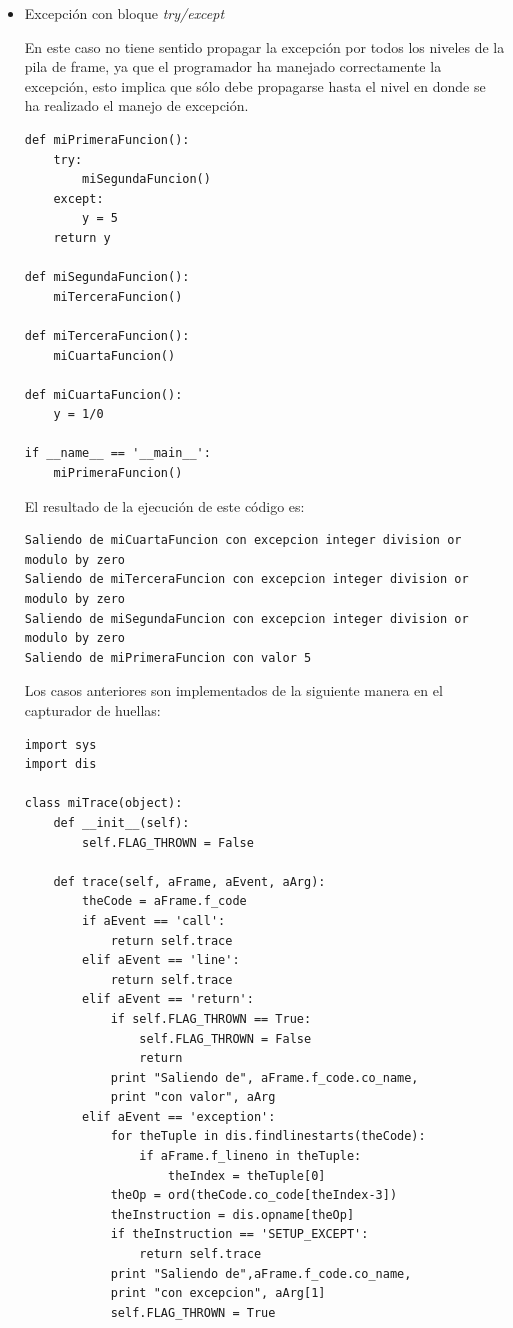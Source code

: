 \documentclass[12pt,legalpaper]{report}
\begin{document}
\begin{itemize}
	\item Excepción con bloque \textit{try/except} 

En este caso no tiene sentido propagar la excepción por todos los niveles de la pila de frame, ya que el programador ha manejado correctamente la excepción, esto implica que sólo debe propagarse hasta el nivel en donde se ha realizado el manejo de excepción.	

\begin{singlespace}
\begin{lstlisting}[style=Python]
def miPrimeraFuncion():
    try:
        miSegundaFuncion()
    except:
        y = 5
    return y
    
def miSegundaFuncion():
    miTerceraFuncion()

def miTerceraFuncion():
    miCuartaFuncion()

def miCuartaFuncion():
    y = 1/0

if __name__ == '__main__':
    miPrimeraFuncion()
\end{lstlisting}
\end{singlespace}

El resultado de la ejecución de este código es:

\begin{singlespace}
\begin{lstlisting}[style=consola,numbers=none]
Saliendo de miCuartaFuncion con excepcion integer division or modulo by zero
Saliendo de miTerceraFuncion con excepcion integer division or modulo by zero
Saliendo de miSegundaFuncion con excepcion integer division or modulo by zero
Saliendo de miPrimeraFuncion con valor 5
\end{lstlisting}
\end{singlespace}	

Los casos anteriores son implementados de la siguiente manera en el capturador de huellas:

\begin{singlespace}
\begin{lstlisting}[style=Python]
import sys
import dis

class miTrace(object):
    def __init__(self):
        self.FLAG_THROWN = False
        
    def trace(self, aFrame, aEvent, aArg):
        theCode = aFrame.f_code
        if aEvent == 'call':
            return self.trace
        elif aEvent == 'line':
            return self.trace
        elif aEvent == 'return':
            if self.FLAG_THROWN == True:
                self.FLAG_THROWN = False
                return            
            print "Saliendo de", aFrame.f_code.co_name, 
            print "con valor", aArg
        elif aEvent == 'exception':
            for theTuple in dis.findlinestarts(theCode):
                if aFrame.f_lineno in theTuple:
                    theIndex = theTuple[0]
            theOp = ord(theCode.co_code[theIndex-3])
            theInstruction = dis.opname[theOp]
            if theInstruction == 'SETUP_EXCEPT':
                return self.trace
            print "Saliendo de",aFrame.f_code.co_name,
            print "con excepcion", aArg[1]
            self.FLAG_THROWN = True         


\end{lstlisting}
\end{singlespace}
\end{itemize}
\end{document}
